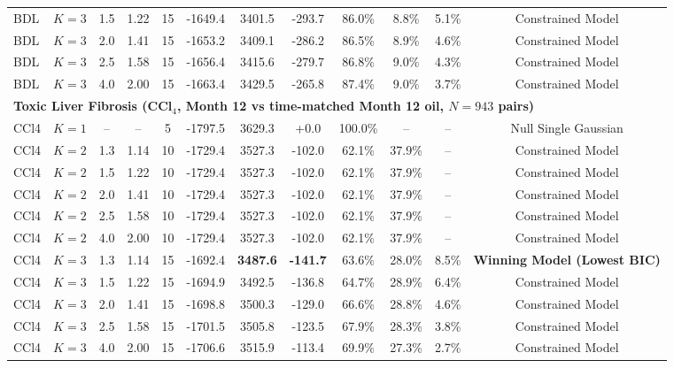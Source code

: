 \documentclass[10pt,a4paper,landscape]{article}
\begin{document}
\begin{table}[H]
\begin{tabular*}{\textwidth}{@{\extracolsep{\fill}} llcccccccccc}
BDL & $K=3$ & 1.5 & 1.22 & 15 & -1649.4 & 3401.5 & -293.7 & 86.0\% & 8.8\% & 5.1\% & Constrained Model \\
BDL & $K=3$ & 2.0 & 1.41 & 15 & -1653.2 & 3409.1 & -286.2 & 86.5\% & 8.9\% & 4.6\% & Constrained Model \\
BDL & $K=3$ & 2.5 & 1.58 & 15 & -1656.4 & 3415.6 & -279.7 & 86.8\% & 9.0\% & 4.3\% & Constrained Model \\
BDL & $K=3$ & 4.0 & 2.00 & 15 & -1663.4 & 3429.5 & -265.8 & 87.4\% & 9.0\% & 3.7\% & Constrained Model \\
\midrule
\multicolumn{12}{l}{\textbf{Toxic Liver Fibrosis (CCl$_4$, Month 12 vs time-matched Month 12 oil, $N = 943$ pairs)}} \\
CCl4 & $K=1$ & -- & -- & 5 & -1797.5 & 3629.3 & +0.0 & 100.0\% & -- & -- & Null Single Gaussian \\
CCl4 & $K=2$ & 1.3 & 1.14 & 10 & -1729.4 & 3527.3 & -102.0 & 62.1\% & 37.9\% & -- & Constrained Model \\
CCl4 & $K=2$ & 1.5 & 1.22 & 10 & -1729.4 & 3527.3 & -102.0 & 62.1\% & 37.9\% & -- & Constrained Model \\
CCl4 & $K=2$ & 2.0 & 1.41 & 10 & -1729.4 & 3527.3 & -102.0 & 62.1\% & 37.9\% & -- & Constrained Model \\
CCl4 & $K=2$ & 2.5 & 1.58 & 10 & -1729.4 & 3527.3 & -102.0 & 62.1\% & 37.9\% & -- & Constrained Model \\
CCl4 & $K=2$ & 4.0 & 2.00 & 10 & -1729.4 & 3527.3 & -102.0 & 62.1\% & 37.9\% & -- & Constrained Model \\
\rowcolor{wincolor} CCl4 & $K=3$ & 1.3 & 1.14 & 15 & -1692.4 & \textbf{3487.6} & \textbf{-141.7} & 63.6\% & 28.0\% & 8.5\% & \textbf{Winning Model (Lowest BIC)} \\
CCl4 & $K=3$ & 1.5 & 1.22 & 15 & -1694.9 & 3492.5 & -136.8 & 64.7\% & 28.9\% & 6.4\% & Constrained Model \\
CCl4 & $K=3$ & 2.0 & 1.41 & 15 & -1698.8 & 3500.3 & -129.0 & 66.6\% & 28.8\% & 4.6\% & Constrained Model \\
CCl4 & $K=3$ & 2.5 & 1.58 & 15 & -1701.5 & 3505.8 & -123.5 & 67.9\% & 28.3\% & 3.8\% & Constrained Model \\
CCl4 & $K=3$ & 4.0 & 2.00 & 15 & -1706.6 & 3515.9 & -113.4 & 69.9\% & 27.3\% & 2.7\% & Constrained Model \\
\bottomrule
\end{tabular*}
\end{table}
\end{document}
